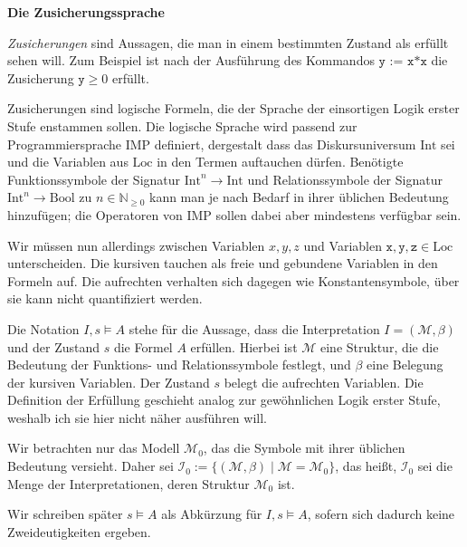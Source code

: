 \documentclass[8pt,fleqn,aspectratio=169]{beamer}
\newcommand{\strong}[1]{\textsf{\textbf{#1}}}
\newcommand{\centerheadline}[1]{%
  \begin{center}\strong{#1}\end{center}}
\newcommand{\parspace}{\vspace{0.8em}}
\newcommand{\code}[1]{\texttt{#1}}
\newcommand{\Bool}{\mathrm{Bool}}
\newcommand{\Int}{\mathrm{Int}}
\newcommand{\Loc}{\mathrm{Loc}}
\newcommand{\N}{\mathbb N}
\begin{document}
\begin{frame}
\centerheadline{Die Zusicherungssprache}
\end{frame}

\begin{frame}
\emph{Zusicherungen} sind Aussagen, die man in einem bestimmten Zustand als
erfüllt sehen will. Zum Beispiel ist nach der Ausführung des Kommandos
$\code{y := x*x}$ die Zusicherung $\code{y}\ge 0$
erfüllt.\pause

\parspace
Zusicherungen sind logische Formeln, die der Sprache der einsortigen Logik
erster Stufe enstammen sollen. Die logische Sprache wird passend zur
Programmiersprache IMP definiert, dergestalt dass das Diskursuniversum
$\Int$ sei und die Variablen aus $\Loc$ in den Termen auftauchen dürfen.
Benötigte Funktionssymbole der Signatur $\Int^n\to\Int$ und
Relationssymbole der Signatur $\Int^n\to\Bool$ zu $n\in\N_{\ge 0}$ kann man
je nach Bedarf in ihrer üblichen Bedeutung hinzufügen; die Operatoren
von IMP sollen dabei aber mindestens verfügbar sein.\pause

\parspace
Wir müssen nun allerdings zwischen Variablen $x,y,z$ und Variablen
$\code{x},\code{y},\code{z}\in\Loc$ unterscheiden. Die kursiven tauchen
als freie und gebundene Variablen in den Formeln auf. Die aufrechten
verhalten sich dagegen wie Konstantensymbole, über sie kann nicht
quantifiziert werden.
\end{frame}

\begin{frame}
Die Notation $I,s\models A$ stehe für die Aussage, dass
die Interpretation $I=(\mathcal M,\beta)$ und der Zustand $s$
die Formel $A$ erfüllen. Hierbei ist $\mathcal M$ eine Struktur, die
die Bedeutung der Funktions- und Relationssymbole festlegt,
und $\beta$ eine Belegung der kursiven Variablen. Der Zustand $s$
belegt die aufrechten Variablen. {\footnotesize Die Definition der
Erfüllung geschieht analog zur gewöhnlichen Logik erster Stufe, weshalb
ich sie hier nicht näher ausführen will.}\pause

\parspace
Wir betrachten nur das Modell $\mathcal M_0$, das die Symbole mit ihrer üblichen
Bedeutung versieht. Daher sei $\mathcal I_0:=\{(\mathcal M,\beta)\mid\mathcal M=\mathcal M_0\}$,
das heißt, $\mathcal I_0$ sei die Menge der Interpretationen, deren Struktur
$\mathcal M_0$ ist.\pause

\parspace
Wir schreiben später $s\models A$ als Abkürzung für $I,s\models A$,
sofern sich dadurch keine Zweideutigkeiten ergeben.
\end{frame}
\end{document}
